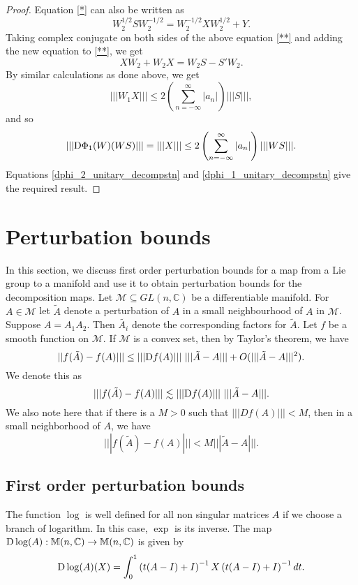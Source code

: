 \documentclass[12pt,epsfig,reqno]{amsart}
\newcommand{\De}{{\rm D}}
\theoremstyle{remark}
\begin{document}
\begin{proof}
Equation \eqref{*} can also be written as
\begin{equation}
W_2^{1/2} S W_2^{-1/2}=W_2^{-1/2} X W_2^{1/2}+Y. \label{**}
\end{equation}
Taking complex conjugate on both sides of the above equation \eqref{**} and adding the new equation to \eqref{**}, we get
\begin{equation}
XW_2+W_2X= W_2S-S'W_2.
\end{equation}
By similar calculations as done above, we get $$|||{W_1 X}|||\leq 2 \left(\sum_{n=-\infty}^{\infty} {|a_n|}\right)  |||{S}|||,$$
and so
\begin{equation}|||{\De \Phi_1(W)}(WS)|||=|||{X}|||\leq 2\left(\sum_{n=-\infty}^{\infty} {|a_n|}\right) |||{WS}|||.\label{dphi_1_unitary_decompstn}\end{equation}
Equations \eqref{dphi_2_unitary_decompstn} and \eqref{dphi_1_unitary_decompstn} give the required result.
\end{proof}

\section{Perturbation bounds}


In this section, we discuss first order perturbation bounds for a map from  a Lie group to a manifold and use it to obtain perturbation bounds for the decomposition maps.  Let $\mathcal M\subseteq GL(n,\mathbb C)$ be a differentiable manifold. For $A\in \mathcal M$ let $\tilde A$ denote a perturbation of $A$ in a small neighbourhood of $A$ in $\mathcal M$. Suppose  $A=A_1 A_2$. Then  $\tilde{A_i}$ denote the corresponding factors for $\tilde A$. Let $f$ be a smooth function on $\mathcal M$. If $\mathcal M$ is a convex set, then by Taylor's theorem, we have
\begin{equation}\label{taylorthmforlinearspace}||f(\tilde A)-f(A)|||\leq |||\De f(A)|||\ |||\tilde A-A|||+O(|||\tilde A-A|||^2).\end{equation} We denote this as $$|||f(\tilde A)-f(A)|||\lesssim |||\De f(A)|||\ |||\tilde A-A|||.$$
We also note here that if there is a $M>0$ such that $|||Df(A)|||<M$, then in a small neighborhood of  $A$,  we have
    \begin{equation}|||f(\tilde{A})- f(A)|||<M|||\tilde{A}- A|||\label{realbound}.\end{equation}
\subsection{First order perturbation bounds}
The function $\log$ is well defined for all non singular matrices $A$ if we choose a branch of  logarithm.  In this case,  $\exp$ is its inverse.
 The map $\De \log (A):\mathbb M(n,\mathbb C)\to \mathbb M(n,\mathbb C)$ is given by
\begin{equation}\label{derivativeoflog}\De \log (A)(X)= \int_0^1\left(t(A-I)+I\right)^{-1}X\left(t(A-I)+I\right)^{-1} dt.\end{equation}
\end{document}
